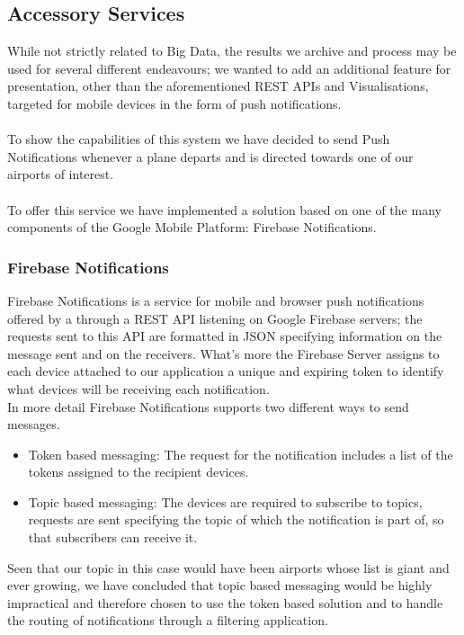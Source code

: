 \subsection{Accessory Services}

While not strictly related to Big Data, the results we archive and process may be used for several different endeavours; we wanted to add an additional feature for presentation, other than the aforementioned REST APIs and Visualisations, targeted for mobile devices in the form of push notifications.
\\ \\
To show the capabilities of this system we have decided to send Push Notifications whenever a plane departs and is directed towards one of our airports of interest.
\\ \\
To offer this service we have implemented a solution based on one of the many components of the Google Mobile Platform: Firebase Notifications.

\subsubsection{Firebase Notifications}

Firebase Notifications is a service for mobile and browser push notifications offered by a through a REST API listening on Google Firebase servers; the requests sent to this API are formatted in JSON specifying information on the message sent and on the receivers.
What's more the Firebase Server assigns to each device attached to our application a unique and expiring token to identify what devices will be receiving each notification.
\\
In more detail Firebase Notifications supports two different ways to send messages.

\begin{itemize}
	\item Token based messaging: The request for the notification includes a list of the tokens assigned to the recipient devices. 
	\item Topic based messaging: The devices are required to subscribe to topics, requests are sent specifying the topic of which the notification is part of, so that subscribers can receive it.
\end{itemize}  

Seen that our topic in this case would have been airports whose list is giant and ever growing, we have concluded that topic based messaging would be highly impractical and therefore chosen to use the token based solution and to handle the routing of notifications through a filtering application.

